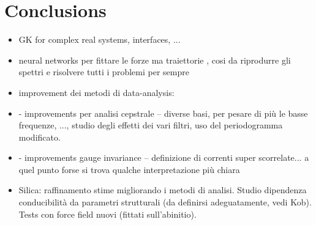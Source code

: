 \chapter{Conclusions}  \label{ch:conclusions}

\begin{itemize}
    \item GK for complex real systems, interfaces, ...
    \item neural networks per fittare le forze ma traiettorie \abinitio, cosi da riprodurre gli spettri e risolvere tutti i problemi per sempre
    \item improvement dei metodi di data-analysis:
    \item - improvements per analisi cepstrale -- diverse basi, per pesare di pi\`u le basse frequenze, ..., studio degli effetti dei vari filtri, uso del periodogramma modificato.
    \item - improvements gauge invariance -- definizione di correnti super scorrelate... a quel punto forse si trova qualche interpretazione pi\`u chiara
    \item Silica: raffinamento stime migliorando i metodi di analisi. Studio dipendenza conducibilit\`a da parametri strutturali (da definirsi adeguatamente, vedi Kob). Tests con force field nuovi (fittati sull'abinitio).
\end{itemize}